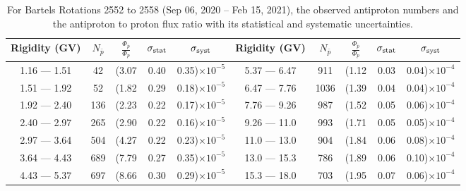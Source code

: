 \begin{table}[p] 
\renewcommand\baselinestretch{1.3}\selectfont
\setlength\tabcolsep{3pt}
\centering
\begin{tabular}{ccccc | ccccc}
\hline
\textbf{Rigidity}  (GV)  & $N_{\bar{p}}$ & $\frac{\Phi_{\bar{p}}}{\Phi_{p}}$ & $\sigma_{\rm{stat}}$ & $\sigma_{\rm{syst}}$ \hspace{1cm}   & \textbf{Rigidity}  (GV)  & $N_{\bar{p}}$ & $\frac{\Phi_{\bar{p}}}{\Phi_{p}}$ & $\sigma_{\rm{stat}}$ & $\sigma_{\rm{syst}}$ \hspace{1cm} \\ 
\hline
1.16 — 1.51   &  42                  &(3.07                          &  0.40              &      0.35)$\times 10^{-5}$  & 5.37 — 6.47                &  911                    &(1.12                                &  0.03                   &      0.04)$\times 10^{-4}$\\
1.51 — 1.92   &  52                  &(1.82                          &  0.29              &      0.18)$\times 10^{-5}$  & 6.47 — 7.76                &  1036                  &(1.39                                &  0.04                   &      0.04)$\times 10^{-4}$\\
1.92 — 2.40   &  136                &(2.23                          &  0.22              &      0.17)$\times 10^{-5}$  & 7.76 — 9.26                &  987                    &(1.52                                &  0.05                   &      0.06)$\times 10^{-4}$\\    
2.40 — 2.97   &  265                &(2.90                          &  0.22              &      0.16)$\times 10^{-5}$  & 9.26 — 11.0                &  993                    &(1.71                                &  0.05                   &      0.05)$\times 10^{-4}$\\    
2.97 — 3.64   &  504                &(4.27                          &  0.22              &      0.23)$\times 10^{-5}$  & 11.0 — 13.0                 &  904                    &(1.84                                &  0.06                   &      0.08)$\times 10^{-4}$\\
3.64 — 4.43   &  689                &(7.79                          &  0.27              &      0.35)$\times 10^{-5}$  & 13.0 — 15.3               &  786                    &(1.89                                &  0.06                   &      0.10)$\times 10^{-4}$\\
4.43 — 5.37   &  697                &(8.66                          &  0.30              &      0.29)$\times 10^{-5}$  & 15.3 — 18.0               &  703                    &(1.95                                &  0.07                   &      0.06)$\times 10^{-4}$\\
\hline
\end{tabular}
\caption[Antiproton to proton flux ratio for Bartels Rotations 2552 to 2558]{For Bartels Rotations 2552 to 2558 (Sep 06, 2020 – Feb 15, 2021), the observed antiproton numbers and the antiproton to proton flux ratio with its statistical and systematic uncertainties.}
\label{TableOfDependent22}
\end{table}

